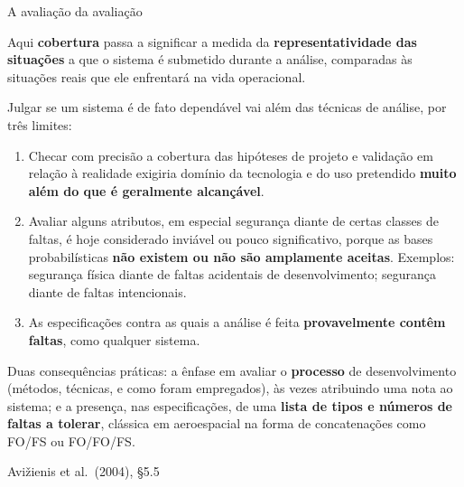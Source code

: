 \documentclass{beamer}
\newcommand{\sect}[1]{\par\smallskip\hfill{\tiny\color{black!55}Avi\v{z}ienis et al.\ (2004), #1}}
\begin{document}
\begin{frame}{A avalia\c{c}\~ao da avalia\c{c}\~ao}
    \footnotesize
    \begin{defi}
        \scriptsize
        Aqui \textbf{cobertura} passa a significar a medida da \textbf{representatividade das situa\c{c}\~oes} a que o sistema \'e submetido durante a an\'alise, comparadas \`as situa\c{c}\~oes reais que ele enfrentar\'a na vida operacional.
    \end{defi}
    \medskip
    Julgar se um sistema \'e de fato depend\'avel vai al\'em das t\'ecnicas de an\'alise, por tr\^es limites:
    \medskip
    \begin{enumerate}
        \item Checar com precis\~ao a cobertura das hip\'oteses de projeto e valida\c{c}\~ao em rela\c{c}\~ao \`a realidade exigiria dom\'inio da tecnologia e do uso pretendido \textbf{muito al\'em do que \'e geralmente alcan\c{c}\'avel}.
        \item Avaliar alguns atributos, em especial seguran\c{c}a diante de certas classes de faltas, \'e hoje considerado invi\'avel ou pouco significativo, porque as bases probabil\'isticas \textbf{n\~ao existem ou n\~ao s\~ao amplamente aceitas}. Exemplos: seguran\c{c}a f\'isica diante de faltas acidentais de desenvolvimento; seguran\c{c}a diante de faltas intencionais.
        \item As especifica\c{c}\~oes contra as quais a an\'alise \'e feita \textbf{provavelmente cont\^em faltas}, como qualquer sistema.
    \end{enumerate}
    \medskip
    \begin{ancora}
        \footnotesize
        Duas consequ\^encias pr\'aticas: a \^enfase em avaliar o \textbf{processo} de desenvolvimento (m\'etodos, t\'ecnicas, e como foram empregados), \`as vezes atribuindo uma nota ao sistema; e a presen\c{c}a, nas especifica\c{c}\~oes, de uma \textbf{lista de tipos e n\'umeros de faltas a tolerar}, cl\'assica em aeroespacial na forma de concatena\c{c}\~oes como FO/FS ou FO/FO/FS.
    \end{ancora}
    \sect{\S5.5}
\end{frame}
\end{document}
